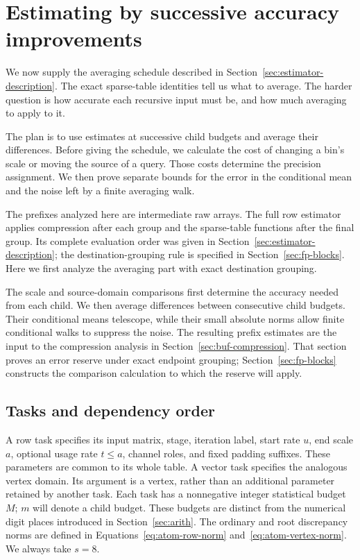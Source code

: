 \section{Estimating by successive accuracy improvements}
\label{sec:est}

We now supply the averaging schedule described in Section~\ref{sec:estimator-description}. The exact sparse-table identities tell us what to average. The harder question is how accurate each recursive input must be, and how much averaging to apply to it.

The plan is to use estimates at successive child budgets and average their differences. Before giving the schedule, we calculate the cost of changing a bin's scale or moving the source of a query. Those costs determine the precision assignment. We then prove separate bounds for the error in the conditional mean and the noise left by a finite averaging walk.

The prefixes analyzed here are intermediate raw arrays. The full row estimator applies compression after each group and the sparse-table functions after the final group. Its complete evaluation order was given in Section~\ref{sec:estimator-description}; the destination-grouping rule is specified in Section~\ref{sec:fp-blocks}. Here we first analyze the averaging part with exact destination grouping.

The scale and source-domain comparisons first determine the accuracy needed
from each child.  We then average differences between consecutive child
budgets.  Their conditional means telescope, while their small absolute
norms allow finite conditional walks to suppress the noise.  The resulting
prefix estimates are the input to the compression analysis in
Section~\ref{sec:buf-compression}.  That section proves an error reserve
under exact endpoint grouping; Section~\ref{sec:fp-blocks} constructs the
comparison calculation to which the reserve will apply.

\subsection{Tasks and dependency order}

A row task specifies its input matrix, stage, iteration label, start rate
$u$, end scale $a$, optional usage rate $t\le a$, channel roles, and fixed
padding suffixes.  These parameters are common to its whole table.  A
vector task specifies the analogous vertex domain.  Its argument is a
vertex, rather than an additional parameter retained by another task.
Each task has a nonnegative integer statistical budget $M$; $m$ will
denote a child budget.  These budgets are distinct from the numerical
digit places introduced in Section~\ref{sec:arith}.
The ordinary and root discrepancy norms are defined in
Equations~\eqref{eq:atom-row-norm} and~\eqref{eq:atom-vertex-norm}.
We always take $s=8$.

